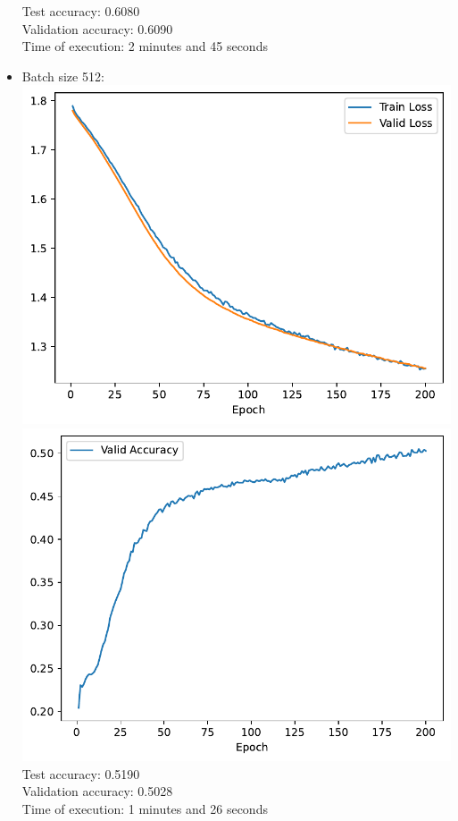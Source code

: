 \documentclass[12pt,a4paper]{article}
\begin{document}
\begin{itemize}
                Test accuracy: 0.6080 \\
                Validation accuracy: 0.6090 \\
                Time of execution: 2 minutes and 45 seconds
            \item Batch size 512: \\
                \includegraphics[width=\imagewidth]{q2/q2_2a_batch_512-training-loss.pdf}
                \includegraphics[width=\imagewidth]{q2/q2_2a_batch_512-validation-accuracy.pdf} \\
                Test accuracy: 0.5190 \\
                Validation accuracy: 0.5028 \\
                Time of execution: 1 minutes and 26 seconds
        \end{itemize}
\end{document}
